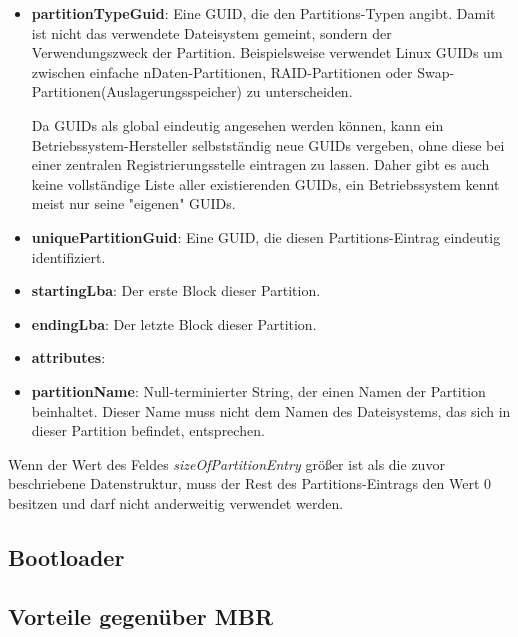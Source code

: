 \begin{itemize}
    \item \textbf{partitionTypeGuid}:
    Eine GUID, die den Partitions-Typen angibt.
    Damit ist nicht das verwendete Dateisystem gemeint, sondern der Verwendungszweck der Partition.
    Beispielsweise verwendet Linux GUIDs um zwischen einfache nDaten-Partitionen, RAID-Partitionen oder Swap-Partitionen(Auslagerungsspeicher) zu unterscheiden.
    
    Da GUIDs als global eindeutig angesehen werden können, kann ein Betriebssystem-Hersteller selbstständig neue GUIDs vergeben, ohne diese bei einer zentralen Registrierungsstelle eintragen zu lassen.
    Daher gibt es auch keine vollständige Liste aller existierenden GUIDs, ein Betriebssystem kennt meist nur seine "eigenen" GUIDs.

    \item \textbf{uniquePartitionGuid}:
    Eine GUID, die diesen Partitions-Eintrag eindeutig identifiziert.

    \item \textbf{startingLba}:
    Der erste Block dieser Partition.

    \item \textbf{endingLba}:
    Der letzte Block dieser Partition.

    \item \textbf{attributes}:
    
    \item \textbf{partitionName}:
    Null-terminierter String, der einen Namen der Partition beinhaltet.
    Dieser Name muss nicht dem Namen des Dateisystems, das sich in dieser Partition befindet, entsprechen.

\end{itemize}

Wenn der Wert des Feldes \textit{sizeOfPartitionEntry} größer ist als die zuvor beschriebene Datenstruktur, muss der Rest des Partitions-Eintrags den Wert 0 besitzen und darf nicht anderweitig verwendet werden.\cite{uefi-spec}

\subsection{Bootloader}


\subsection{Vorteile gegenüber MBR}
\label{sec:gpt:advantages}

